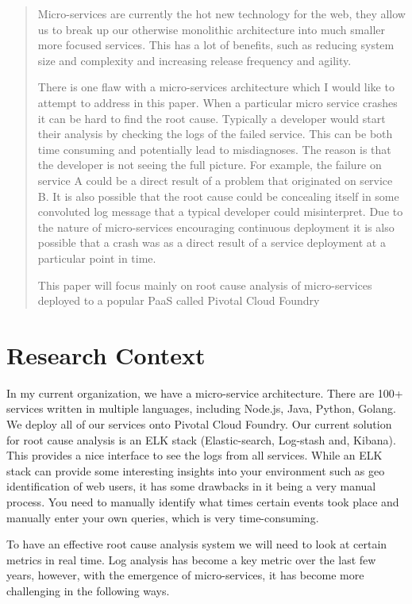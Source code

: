 \begin{abstract}
Micro-services are currently the hot new technology for the web, they allow us to break up our otherwise monolithic architecture into much smaller more focused services. This has a lot of benefits, such as reducing system size and complexity and increasing release frequency and agility. 

There is one flaw with a micro-services architecture which I would like to attempt to address in this paper. When a particular micro service crashes it can be hard to find the root cause. Typically a developer would start their analysis by checking the logs of the failed service. This can be both time consuming and potentially lead to misdiagnoses. The reason is that the developer is not seeing the full picture. For example, the failure on service A could be a direct result of a problem that originated on service B. It is also possible that the root cause could be concealing itself in some convoluted log message that a typical developer could misinterpret. Due to the nature of micro-services encouraging continuous deployment it is also possible that a crash was as a direct result of a service deployment at a particular point in time. 

This paper will focus mainly on root cause analysis of micro-services deployed to a popular PaaS called Pivotal Cloud Foundry

\end{abstract}

\chapter{Research Context}
In my current organization, we have a micro-service architecture. There are 100+ services written in multiple languages, including Node.js, Java, Python, Golang. We deploy all of our services onto Pivotal Cloud Foundry. Our current solution for root cause analysis is an ELK stack (Elastic-search, Log-stash and, Kibana). This provides a nice interface to see the logs from all services. While an ELK stack can provide some interesting insights into your environment such as geo identification of web users\cite{7508191}, it has some drawbacks in it being a very manual process. You need to manually identify what times certain events took place and manually enter your own queries, which is very time-consuming.

To have an effective root cause analysis system we will need to look at certain metrics in real time. Log analysis has become a key metric over the last few years, however, with the emergence of micro-services, it has become more challenging in the following ways.

